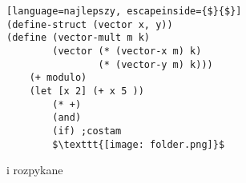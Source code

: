 \documentclass{article}
\begin{document}
\ttfamily

\begin{lstlisting}[language=najlepszy, escapeinside={$}{$}]
(define-struct (vector x, y))
(define (vector-mult m k) 
        (vector (* (vector-x m) k) 
                (* (vector-y m) k)))
    (+ modulo)
    (let [x 2] (+ x 5 ))
        (* +)
        (and)
        (if) ;costam
        $\texttt{[image: folder.png]}$
\end{lstlisting}

i rozpykane\kondow
\end{document}
